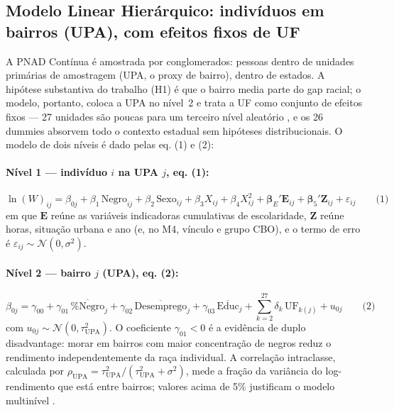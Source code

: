 \documentclass[11pt, a4paper, oneside]{article}
\begin{document}
\subsection*{Modelo Linear Hierárquico: indivíduos em bairros (UPA), com efeitos fixos de UF}
\label{subsec:hlm}

A PNAD Contínua é amostrada por conglomerados: pessoas dentro de unidades primárias de
amostragem (UPA, o proxy de bairro), dentro de estados. A hipótese substantiva do
trabalho (H1) é que o {bairro} media parte do gap racial; o modelo, portanto, coloca
a UPA no nível~2 e trata a UF como conjunto de efeitos fixos --- 27 unidades são poucas para
um terceiro nível aleatório \cite{angrist2009}, e os 26 {dummies} absorvem todo o
contexto estadual sem hipóteses distribucionais. O modelo de dois níveis é dado pelas eq. (1) e (2):

\paragraph{Nível 1 --- indivíduo $i$ na UPA $j$, eq. (1):}
\begin{equation*}
\ln(W)_{ij} = \beta_{0j} + \beta_1\,\text{Negro}_{ij} + \beta_2\,\text{Sexo}_{ij}
  + \beta_3 X_{ij} + \beta_4 X^2_{ij} + \boldsymbol{\beta}_{E}'\mathbf{E}_{ij}
  + \boldsymbol{\beta}_{5}'\mathbf{Z}_{ij} + \varepsilon_{ij}
  \qquad\text{(1)}
\end{equation*}
em que $\mathbf{E}$ reúne as variáveis indicadoras cumulativas de escolaridade, $\mathbf{Z}$
reúne horas, situação urbana e ano (e, no M4, vínculo e grupo CBO), e o termo de erro é $\varepsilon_{ij}\sim\mathcal{N}(0,\sigma^2)$.

\paragraph{Nível 2 --- bairro $j$ (UPA), eq. (2):}
\begin{equation*}
\beta_{0j} = \gamma_{00} + \gamma_{01}\,\overline{\%\text{Negro}}_{j}
  + \gamma_{02}\,\overline{\text{Desemprego}}_{j} + \gamma_{03}\,\overline{\text{Educ}}_{j}
  + \sum_{k=2}^{27}\delta_k\,\text{UF}_{k(j)} + u_{0j}
  \qquad\text{(2)}
\end{equation*}
com $u_{0j}\sim\mathcal{N}(0,\tau^2_{\text{UPA}})$.
O coeficiente $\gamma_{01}<0$ é a evidência de {duplo disadvantage}: morar em
bairros com maior concentração de negros reduz o rendimento {independentemente}
da raça individual. A correlação intraclasse, calculada por
$\rho_{\text{UPA}} = \tau^2_{\text{UPA}}/(\tau^2_{\text{UPA}} + \sigma^2)$,
mede a fração da variância do log-rendimento que está {entre} bairros; valores
acima de 5\% justificam o modelo multinível \cite{raudenbush2002}.
\end{document}
